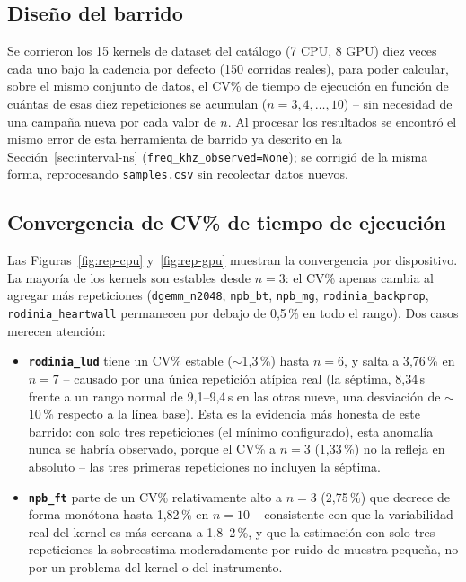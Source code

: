 \subsection{Diseño del barrido}

Se corrieron los 15 kernels de dataset del catálogo (7 CPU, 8 GPU) diez
veces cada uno bajo la cadencia por defecto (150 corridas reales), para
poder calcular, sobre el mismo conjunto de datos, el CV\% de tiempo de
ejecución en función de cuántas de esas diez repeticiones se acumulan
($n=3,4,\ldots,10$) -- sin necesidad de una campaña nueva por cada valor de
$n$. Al procesar los resultados se encontró el mismo error de esta
herramienta de barrido ya descrito en la Sección~\ref{sec:interval-ns}
(\texttt{freq\_khz\_observed=None}); se corrigió de la misma forma,
reprocesando \texttt{samples.csv} sin recolectar datos nuevos.

\subsection{Convergencia de CV\% de tiempo de ejecución}

Las Figuras~\ref{fig:rep-cpu} y~\ref{fig:rep-gpu} muestran la convergencia
por dispositivo. La mayoría de los kernels son estables desde $n=3$: el CV\%
apenas cambia al agregar más repeticiones (\texttt{dgemm\_n2048},
\texttt{npb\_bt}, \texttt{npb\_mg}, \texttt{rodinia\_backprop},
\texttt{rodinia\_heartwall} permanecen por debajo de 0{,}5\,\% en todo el
rango). Dos casos merecen atención:

\begin{itemize}
  \item \textbf{\texttt{rodinia\_lud}} tiene un CV\% estable ($\sim$1{,}3\,\%)
    hasta $n=6$, y salta a 3{,}76\,\% en $n=7$ -- causado por una única
    repetición atípica real (la séptima, 8{,}34\,s frente a un rango normal
    de 9{,}1--9{,}4\,s en las otras nueve, una desviación de $\sim$10\,\%
    respecto a la línea base). Esta es la evidencia más honesta de este
    barrido: con solo tres repeticiones (el mínimo configurado), esta
    anomalía nunca se habría observado, porque el CV\% a $n=3$ (1{,}33\,\%)
    no la refleja en absoluto -- las tres primeras repeticiones no
    incluyen la séptima.
  \item \textbf{\texttt{npb\_ft}} parte de un CV\% relativamente alto a
    $n=3$ (2{,}75\,\%) que decrece de forma monótona hasta 1{,}82\,\% en
    $n=10$ -- consistente con que la variabilidad real del kernel es
    más cercana a 1{,}8--2\,\%, y que la estimación con solo tres
    repeticiones la sobreestima moderadamente por ruido de muestra pequeña,
    no por un problema del kernel o del instrumento.
\end{itemize}

